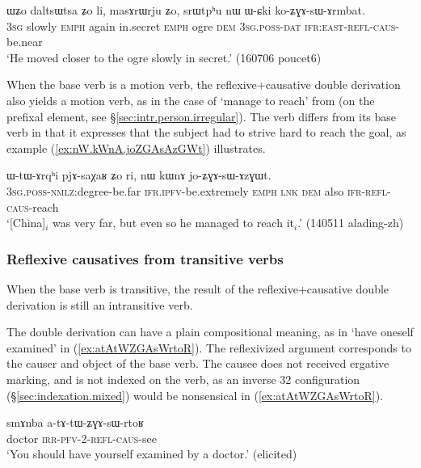 \begin{exe}
\ex \label{ex:WCki.koZGAsArmbat}
\gll ɯʑo daltsɯtsa ʑo li, masɤrɯrju ʑo, srɯtpʰu nɯ ɯ-ɕki ko-ʑɣɤ-sɯ-ɤrmbat. \\
\textsc{3sg} slowly \textsc{emph} again in.secret \textsc{emph} ogre \textsc{dem} \textsc{3sg}.\textsc{poss}-\textsc{dat} \textsc{ifr}:\textsc{east}-\textsc{refl}-\textsc{caus}-be.near \\
\glt `He moved closer to the ogre slowly in secret.'  (160706 poucet6)
\end{exe}

   
When the base verb is a motion verb, the reflexive+causative double derivation also yields a motion verb, as in the case of   `manage to reach' from  (on the  prefixal element, see §\ref{sec:intr.person.irregular}). The verb  differs from its base verb in that it expresses that the subject  had to strive hard to reach the goal, as example (\ref{ex:nW.kWnA.joZGAsAzGWt}) illustrates.

\begin{exe}
\ex \label{ex:nW.kWnA.joZGAsAzGWt}
\gll ɯ-tɯ-ɤrqʰi pjɤ-saχaʁ ʑo ri, nɯ kɯnɤ jo-ʑɣɤ-sɯ-ɤzɣɯt. \\
\textsc{3sg}.\textsc{poss}-\textsc{nmlz}:degree-be.far \textsc{ifr}.\textsc{ipfv}-be.extremely \textsc{emph} \textsc{lnk} \textsc{dem} also \textsc{ifr}-\textsc{refl}-\textsc{caus}-reach \\
\glt `[China]$_i$ was very far, but even so he managed to reach it$_i$.' (140511 alading-zh) 
\end{exe}
\subsubsection{Reflexive  causatives from transitive verbs}
When the base verb is transitive, the result of the reflexive+causative double derivation is still an intransitive verb. 

The double derivation can have a plain compositional meaning, as in  `have oneself examined' in (\ref{ex:atAtWZGAsWrtoR}). The reflexivized argument corresponds to the causer and object of the base verb. The causee  does not received ergative marking, and is not indexed on the verb, as an inverse 3\fl{}2 configuration (§\ref{sec:indexation.mixed}) would be nonsensical in (\ref{ex:atAtWZGAsWrtoR}).


\begin{exe}
\ex \label{ex:atAtWZGAsWrtoR}
\gll smɤnba a-tɤ-tɯ-ʑɣɤ-sɯ-rtoʁ \\
doctor \textsc{irr}-\textsc{pfv}-2-\textsc{refl}-\textsc{caus}-see \\
\glt `You should have yourself examined by a doctor.' (elicited)
\end{exe}

